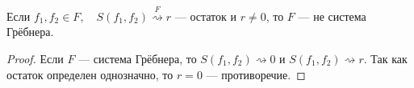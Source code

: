 \begin{corollary}
    Если $f_1, f_2 \in F, \quad S(f_1, f_2) \overset{F}{\rightsquigarrow} r$ --- остаток и $r \neq 0$, то $F$ --- не система Грёбнера. 
\end{corollary}

\begin{proof}
    Если $F$ --- система Грёбнера, то $S(f_1, f_2) \rightsquigarrow 0$ и $S(f_1, f_2) \rightsquigarrow r$.
    Так как остаток определен однозначно, то $r = 0$ --- противоречие.
\end{proof}
